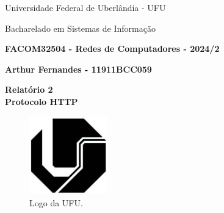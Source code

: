 \documentclass[12pt,a4paper]{report}
\begin{document}
	\begin{center}
		{\Large Universidade Federal de Uberlândia - UFU}
		
		Bacharelado em Sistemas de Informação
		
		\textbf{FACOM32504 - Redes de Computadores - 2024/2}
		
		\textbf{Arthur Fernandes - 11911BCC059}
	\end{center}
	
	\vspace{10pt}

	\begin{center}
		{\LARGE \textbf{Relatório 2 \\ \vspace{10pt} Protocolo HTTP}}
	\end{center}
	
	\vspace{10pt}
	
	\begin{figure}[ht]
		\centering
		\includegraphics[width=0.3\textwidth]{ufu.png}
		\caption{Logo da UFU.}
		\label{fig:logoUFU1}
	\end{figure}
\end{document}
